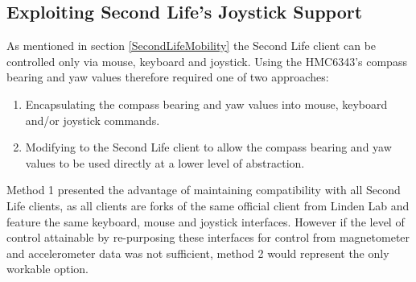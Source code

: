 

\subsection{Exploiting Second Life's Joystick Support}

\label{exploitJoystick}

\newcommand{\ArduinoJoystickVideoFootnote}{\footnote{\url{https://www.youtube.com/watch?v=-ddtmqoGNmg}}}

\newcommand{\atmegaFootnote}{\footnote{\url{http://www.atmel.com/devices/ATMEGA16U2.aspx}}}

\newcommand{\atmegaTFootnote}{\footnote{\url{http://www.atmel.com/devices/atmega328.aspx}}}

\newcommand{\arduinousbhidFootnote}{\footnote{\url{http://hunt.net.nz/users/darran/weblog/a3599/}}}

\newcommand{\lufaFootnote}{\footnote{\url{http://www.fourwalledcubicle.com/LUFA.php}}}


As mentioned in section \ref{SecondLifeMobility} the Second Life client can be controlled only via mouse, keyboard and joystick. Using the HMC6343's compass bearing and yaw values therefore required one of two approaches:

\begin{enumerate}
	\item Encapsulating the compass bearing and yaw values into mouse, keyboard and/or joystick commands.
	\item Modifying to the Second Life client to allow the compass bearing and yaw values to be used directly at a lower level of abstraction.
\end{enumerate}

Method 1 presented the advantage of maintaining compatibility with all Second Life clients, as all clients are forks of the same official client from Linden Lab and feature the same keyboard, mouse and joystick interfaces. However if the level of control attainable by re-purposing these interfaces for control from magnetometer and accelerometer data was not sufficient, method 2 would represent the only workable option.


